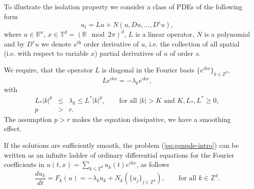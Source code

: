 To illustrate the isolation property we consider a class of  PDEs of the following form
\begin{equation}
  u_t = L u + N\left(u,Du,\dots,D^ru\right), \label{eq:genpde-intro}
\end{equation}
where $u \in \mathbb{R}^n$,  $x \in \mathbb{T}^d=\left(\mathbb{R}\mod 2\pi\right)^d$, $L$ is a linear operator, $N$ is a
polynomial and by $D^s u$ we denote $s^{\text{th}}$ order derivative of
$u$, i.e. the collection of all spatial (i.e. with respect to variable $x$) partial derivatives of $u$ of
order $s$. %

We require, that the operator $L$ is diagonal in the Fourier basis
$\{e^{ikx}\}_{k \in \mathbb{Z}^d}$,
\begin{equation*}
  L e^{ikx}= -\lambda_k e^{ikx},
\end{equation*}
with
\begin{eqnarray*}
 L_* |k|^p &\leq& \lambda_k \leq  L^* |k|^p, \qquad \text{for all $|k| > K$ and  $K,L_*,L^* \geq 0$}, \\
    p &>& r.
\end{eqnarray*}
The assumption $p>r$ makes the equation dissipative,  we have a smoothing effect.


If the solutions are sufficiently smooth, the problem (\ref{eq:genpde-intro}) can be written as an infinite ladder of ordinary differential equations for the Fourier
coefficients in $u(t,x)=\sum_{k \in \mathbb{Z}^d} u_k(t) e^{i kx}$, as follows
\begin{equation}
  \frac{d u_k}{dt} = F_k(u)=-\lambda_k u_k + N_k\left(\{u_j\}_{j \in \mathbb{Z}^d}\right), \qquad \mbox{for all
  $k \in \mathbb{Z}^d$}. \label{eq:fueq}
\end{equation}



